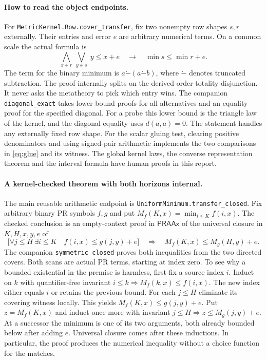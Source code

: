 \paragraph{How to read the object endpoints.}
For \texttt{MetricKernel.Row.cover\_transfer}, fix two nonempty row shapes \(s,r\) externally. Their entries and error \(e\) are arbitrary numerical terms. On a common scale the actual formula is
\[
 \bigwedge_{x\in r}\ \bigvee_{y\in s}\; y\le x+e
 \quad\longrightarrow\quad \min s\le\min r+e.
\]
The term for the binary minimum is \(a\mathbin{\dot-}(a\mathbin{\dot-}b)\), where \(\dot-\) denotes truncated subtraction. The proof internally splits on the derived order-totality disjunction. It never asks the metatheory to pick which entry wins. The companion \texttt{diagonal\_exact} takes lower-bound proofs for all alternatives and an equality proof for the specified diagonal. For a probe this lower bound is the triangle law of the kernel, and the diagonal equality uses \(d(a,a)=0\). The statement handles any externally fixed row shape. For the scalar gluing test, clearing positive denominators and using signed-pair arithmetic implements the two comparisons in \eqref{eq:glue} and its witness. The global kernel laws, the converse representation theorem and the interval formula have human proofs in this report.

\paragraph{A kernel-checked theorem with both horizons internal.}
The main reusable arithmetic endpoint is \texttt{UniformMinimum.transfer\_closed}. Fix arbitrary binary PR symbols \(f,g\) and put \(M_f(K,x)=\min_{i\le K} f(i,x)\). The checked conclusion is an empty-context proof in \(\mathsf{PRAAx}\) of the universal closure in \(K,H,x,y,e\) of
\[
 \big[\forall j\le H\ \exists i\le K\quad f(i,x)\le g(j,y)+e\big]
 \quad\Longrightarrow\quad M_f(K,x)\le M_g(H,y)+e .
\]
The companion \texttt{symmetric\_closed} proves both inequalities from the two directed covers. Both scans are actual PR terms, starting at index zero. To see why a bounded existential in the premise is harmless, first fix a source index \(i\). Induct on \(k\) with quantifier-free invariant \(i\le k\Rightarrow M_f(k,x)\le f(i,x)\). The new index either equals \(i\) or retains the previous bound. For each \(j\le H\) eliminate its covering witness locally. This yields \(M_f(K,x)\le g(j,y)+e\). Put \(z=M_f(K,x)\) and induct once more with invariant \(j\le H\Rightarrow z\le M_g(j,y)+e\). At a successor the minimum is one of its two arguments, both already bounded below after adding \(e\). Universal closure comes after these inductions. In particular, the proof produces the numerical inequality without a choice function for the matches.

